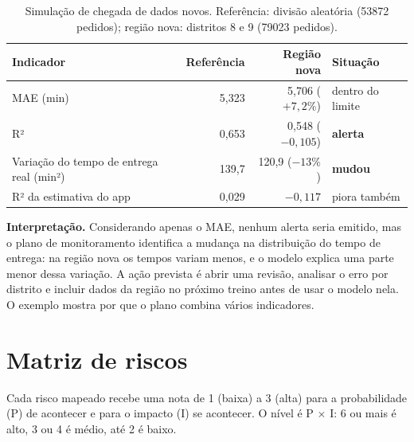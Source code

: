 \documentclass[11pt,a4paper]{article}
\begin{document}
\begin{table}[H]
\centering\small
\begin{tabular}{l r r l}
\toprule
Indicador & Referência & Região nova & Situação \\
\midrule
MAE (min) & 5,323 & 5,706 ($+7{,}2\%$) & dentro do limite \\
R² & 0,653 & 0,548 ($-0{,}105$) & \textbf{alerta} \\
Variação do tempo de entrega real (min²) & 139,7 & 120,9 ($-13\%$) & \textbf{mudou} \\
R² da estimativa do app & 0,029 & $-0{,}117$ & piora também \\
\bottomrule
\end{tabular}
\caption{Simulação de chegada de dados novos. Referência: divisão aleatória (\num{53872}
pedidos); região nova: distritos 8 e 9 (\num{79023} pedidos).}
\label{tab:sim}
\end{table}

\noindent\textbf{Interpretação.} Considerando apenas o MAE, nenhum alerta seria emitido, mas o plano
de monitoramento identifica a mudança na distribuição do tempo de entrega: na região
nova os tempos variam menos, e o modelo explica uma parte menor dessa variação. A ação prevista
é abrir uma revisão, analisar o erro por distrito e incluir dados da região no próximo treino
antes de usar o modelo nela. O exemplo mostra por que o plano combina vários indicadores.

\section{Matriz de riscos}
\label{sec:risco}

Cada risco mapeado recebe uma nota de 1 (baixa) a 3 (alta) para a probabilidade (P) de acontecer e
para o impacto (I) se acontecer. O nível é P $\times$ I: 6 ou mais é alto, 3 ou 4 é médio,
até 2 é baixo.
\end{document}
